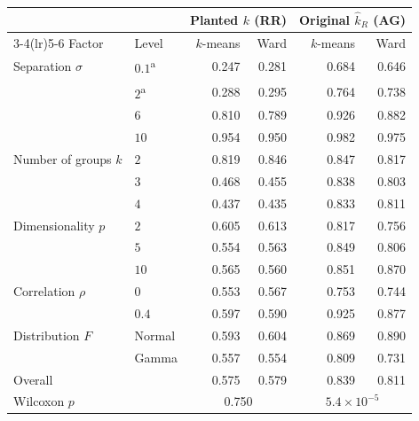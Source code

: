 \begin{tabular}{llrrrr}
\toprule
 & & \multicolumn{2}{c}{Planted $k$ (RR)} & \multicolumn{2}{c}{Original $\hat{k}_R$ (AG)} \\
\cmidrule(lr){3-4}\cmidrule(lr){5-6}
Factor & Level & $k$-means & Ward & $k$-means & Ward \\
\midrule
Separation $\sigma$ & $0.1$\textsuperscript{a} & 0.247 & 0.281 & 0.684 & 0.646 \\
 & $2$\textsuperscript{a} & 0.288 & 0.295 & 0.764 & 0.738 \\
 & $6$ & 0.810 & 0.789 & 0.926 & 0.882 \\
 & $10$ & 0.954 & 0.950 & 0.982 & 0.975 \\
\addlinespace
Number of groups $k$ & $2$ & 0.819 & 0.846 & 0.847 & 0.817 \\
 & $3$ & 0.468 & 0.455 & 0.838 & 0.803 \\
 & $4$ & 0.437 & 0.435 & 0.833 & 0.811 \\
\addlinespace
Dimensionality $p$ & $2$ & 0.605 & 0.613 & 0.817 & 0.756 \\
 & $5$ & 0.554 & 0.563 & 0.849 & 0.806 \\
 & $10$ & 0.565 & 0.560 & 0.851 & 0.870 \\
\addlinespace
Correlation $\rho$ & $0$ & 0.553 & 0.567 & 0.753 & 0.744 \\
 & $0.4$ & 0.597 & 0.590 & 0.925 & 0.877 \\
\addlinespace
Distribution $F$ & Normal & 0.593 & 0.604 & 0.869 & 0.890 \\
 & Gamma & 0.557 & 0.554 & 0.809 & 0.731 \\
\midrule
Overall & & 0.575 & 0.579 & 0.839 & 0.811 \\
Wilcoxon $p$ & & \multicolumn{2}{c}{0.750} & \multicolumn{2}{c}{$5.4\times10^{-5}$} \\
\bottomrule
\end{tabular}
